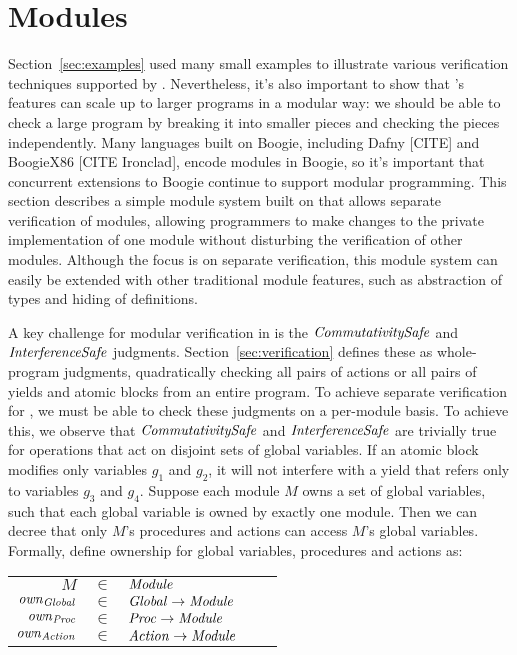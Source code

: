 \section{Modules}
\label{sec:modules}

Section~\ref{sec:examples} used many small examples to illustrate various verification techniques supported by \civl.
Nevertheless, it's also important to show that \civl's features can scale up to larger programs in a modular way:
we should be able to check a large program by breaking it into smaller pieces and checking the pieces independently.
Many languages built on Boogie, including Dafny [CITE] and BoogieX86 [CITE Ironclad], encode modules in Boogie,
so it's important that concurrent extensions to Boogie continue to support modular programming.
This section describes a simple module system built on \civl that allows separate verification of modules,
allowing programmers to make changes to the private implementation of one module
without disturbing the verification of other modules.
Although the focus is on separate verification,
this module system can easily be extended with other traditional module features,
such as abstraction of types and hiding of definitions.

A key challenge for modular verification in \civl is the $\mathit{CommutativitySafe}$ and $\mathit{InterferenceSafe}$ judgments.
Section~\ref{sec:verification} defines these as whole-program judgments,
quadratically checking all pairs of actions or all pairs of yields and atomic blocks from an entire program.
To achieve separate verification for \civl,
we must be able to check these judgments on a per-module basis.
To achieve this,
we observe that $\mathit{CommutativitySafe}$ and $\mathit{InterferenceSafe}$ are trivially true for operations that act on disjoint sets of global variables.
If an atomic block modifies only variables $g_1$ and $g_2$, it will not interfere with a yield that refers only to variables $g_3$ and $g_4$.
Suppose each module $M$ owns a set of global variables, such that each global variable is owned by exactly one module.
Then we can decree that only $M$'s procedures and actions can access $M$'s global variables.
Formally, define ownership for global variables, procedures and actions as:

\begin{tabular}{rclcl}
$M$ & $\in$ & $\mathit{Module}$ \\
$\mathit{own}_{\mathit{Global}}$ & $\in$ & $\mathit{Global} \rightarrow \mathit{Module}$ \\
$\mathit{own}_{\mathit{Proc}}$ & $\in$ & $\mathit{Proc} \rightarrow \mathit{Module}$ \\
$\mathit{own}_{\mathit{Action}}$ & $\in$ & $\mathit{Action} \rightarrow \mathit{Module}$ \\
\end{tabular}

